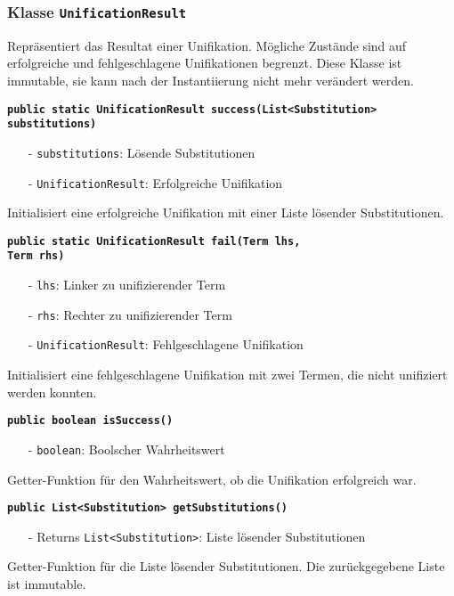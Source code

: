 \documentclass[parskip=full,11pt,twoside]{scrartcl}
\begin{document}
\subsubsection{Klasse \texttt{UnificationResult}}
Repräsentiert das Resultat einer Unifikation. Mögliche Zustände sind auf erfolgreiche und fehlgeschlagene Unifikationen begrenzt. Diese Klasse ist immutable, sie kann nach der Instantiierung nicht mehr verändert werden.

\textbf{\texttt{public static UnificationResult success(List<Substitution>\\substitutions)}}
\begin{itemize}[noitemsep]
	\item[-] \texttt{substitutions}: Lösende Substitutionen
	\item[-] \texttt{UnificationResult}: Erfolgreiche Unifikation
\end{itemize}
Initialisiert eine erfolgreiche Unifikation mit einer Liste lösender Substitutionen.

\textbf{\texttt{public static UnificationResult fail(Term lhs,\\Term rhs)}}
\begin{itemize}[noitemsep]
	\item[-] \texttt{lhs}: Linker zu unifizierender Term
	\item[-] \texttt{rhs}: Rechter zu unifizierender Term
	\item[-] \texttt{UnificationResult}: Fehlgeschlagene Unifikation
\end{itemize}
Initialisiert eine fehlgeschlagene Unifikation mit zwei Termen, die nicht unifiziert werden konnten.

\textbf{\texttt{public boolean isSuccess()}}
\begin{itemize}[noitemsep]
	\item[-] \texttt{boolean}: Boolscher Wahrheitswert
\end{itemize}
Getter-Funktion für den Wahrheitswert, ob die Unifikation erfolgreich war.

\textbf{\texttt{public List<Substitution> getSubstitutions()}}
\begin{itemize}[noitemsep]
	\item[-] Returns \texttt{List<Substitution>}: Liste lösender Substitutionen
\end{itemize}
Getter-Funktion für die Liste lösender Substitutionen. Die zurückgegebene Liste ist immutable.
\end{document}
